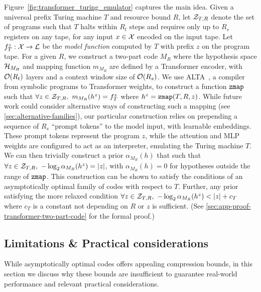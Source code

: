 Figure~\ref{fig:transformer_turing_emulator} captures the main idea.
Given a universal prefix Turing machine $T$ and resource bound $R$, let ${\mathcal{Z}}_{T,R}$ denote the set of programs such that $T$ halts within $R_t$ steps and requires only up to $R_s$ registers on any tape, for any input $x \in {\mathcal{X}}$ encoded on the input tape. Let $f^z_T: {\mathcal{X}} \rightarrow {\mathcal{L}}$ be the \emph{model function} computed by $T$ with prefix $z$ on the program tape. For a given $R$, we construct a two-part code $M_R$ where the hypothesis space ${\mathcal{H}}_{M_R}$ and mapping function $m_{M_R}$ are defined by a Transformer encoder, with ${\mathcal{O}}(R_t)$ layers and a context window size of ${\mathcal{O}}(R_s)$. 
We use ALTA~\citep{shaw2024alta}, a compiler from symbolic programs to Transformer weights, to construct a function $\texttt{zmap}$ such that $\forall z \in {\mathcal{Z}}_{T,R},~m_{M_R}(h^z) = f^z_T$ where $h^z = \texttt{zmap}(T,R,z)$. While future work could consider alternative ways of constructing such a mapping (see \ref{sec:alternative-families}), our particular construction relies on prepending a sequence of $R_s$ ``prompt tokens'' to the model input, with learnable embeddings. These prompt tokens represent the program $z$, while the attention and MLP weights are configured to act as an interpreter, emulating the Turing machine $T$. We can then trivially construct a prior $\alpha_{M_R}(h)$ that such that $\forall z \in {\mathcal{Z}}_{T,R},~-\log_2 \alpha_{M_R}(h^z) = |z|$, with $\alpha_{M_R}(h) = 0$ for hypotheses outside the range of $\texttt{zmap}$. This construction can be shown to satisfy the conditions of an asymptotically optimal family of codes with respect to $T$. Further, any prior satisfying the more relaxed condition $\forall z \in {\mathcal{Z}}_{T,R},~-\log_2 \alpha_{M_R}(h^z) < |z| + c_T$ where $c_T$ is a constant not depending on $R$ or $z$ is sufficient. (See \ref{sec:app-proof-transformer-two-part-code} for the formal proof.) 

\subsection{Limitations \& Practical considerations}
\label{sec:practical-considerations}

While asymptotically optimal codes offers appealing compression bounds, in this section we discuss why these bounds are insufficient to guarantee real-world performance and relevant practical considerations.

